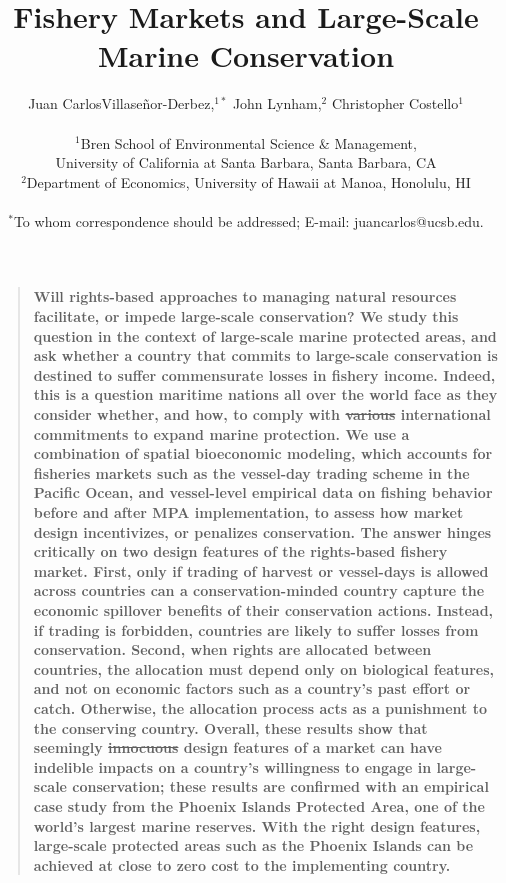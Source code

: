 \documentclass[12pt]{article}
\title{Fishery Markets and Large-Scale Marine Conservation}
\author{Juan CarlosVillase\~{n}or-Derbez,$^{1\ast}$ John Lynham,$^{2}$ Christopher Costello$^{1}$\\
\\
\normalsize{$^{1}$Bren School of Environmental Science \& Management,}\\
\normalsize{University of California at Santa Barbara, Santa Barbara, CA}\\
\normalsize{$^{2}$Department of Economics, University of Hawaii at Manoa, Honolulu, HI}\\
\\
\normalsize{$^\ast$To whom correspondence should be addressed; E-mail: juancarlos@ucsb.edu.}
}
\date{}
\newenvironment{sciabstract}{%
\begin{quote} \bf}
{\end{quote}}
\providecommand{\DIFaddtex}[1]{{\protect\color{blue}\uwave{#1}}} %
\providecommand{\DIFdeltex}[1]{{\protect\color{red}\sout{#1}}}                      %
\providecommand{\DIFaddbegin}{} %
\providecommand{\DIFaddend}{} %
\providecommand{\DIFdelbegin}{} %
\providecommand{\DIFdelend}{} %
\providecommand{\DIFadd}[1]{\texorpdfstring{\DIFaddtex{#1}}{#1}} %
\providecommand{\DIFdel}[1]{\texorpdfstring{\DIFdeltex{#1}}{}} %
\newcommand{\DIFscaledelfig}{0.5}
\newlength{\DIFdelgraphicswidth} %
\newlength{\DIFdelgraphicsheight} %
\newcommand{\DIFaddincludegraphics}[2][]{{\color{blue}\fbox{\DIFOincludegraphics[#1]{#2}}}} %
\newcommand{\DIFdelincludegraphics}[2][]{%
\sbox{\DIFdelgraphicsbox}{\DIFOincludegraphics[#1]{#2}}%
\settoboxwidth{\DIFdelgraphicswidth}{\DIFdelgraphicsbox} %
\settoboxtotalheight{\DIFdelgraphicsheight}{\DIFdelgraphicsbox} %
\scalebox{\DIFscaledelfig}{%
\parbox[b]{\DIFdelgraphicswidth}{\usebox{\DIFdelgraphicsbox}\\[-\baselineskip] \rule{\DIFdelgraphicswidth}{0em}}\llap{\resizebox{\DIFdelgraphicswidth}{\DIFdelgraphicsheight}{%
\setlength{\unitlength}{\DIFdelgraphicswidth}%
\begin{picture}(1,1)%
\thicklines\linethickness{2pt} %
{\color[rgb]{1,0,0}\put(0,0){\framebox(1,1){}}}%
{\color[rgb]{1,0,0}\put(0,0){\line( 1,1){1}}}%
{\color[rgb]{1,0,0}\put(0,1){\line(1,-1){1}}}%
\end{picture}%
}\hspace*{3pt}}} %
} %
\DeclareRobustCommand{\DIFaddbegin}{\DIFOaddbegin \let\includegraphics\DIFaddincludegraphics} %
\DeclareRobustCommand{\DIFaddend}{\DIFOaddend \let\includegraphics\DIFOincludegraphics} %
\DeclareRobustCommand{\DIFdelbegin}{\DIFOdelbegin \let\includegraphics\DIFdelincludegraphics} %
\DeclareRobustCommand{\DIFdelend}{\DIFOaddend \let\includegraphics\DIFOincludegraphics} %
\begin{document}

\baselineskip24pt


\maketitle



\begin{sciabstract}
Will rights-based approaches to managing natural resources facilitate, or impede large-scale conservation? We study this question in the context of large-scale marine protected areas, and ask whether a country that commits to large-scale conservation is destined to suffer commensurate losses in fishery income.  Indeed, this is a question maritime nations all over the world face as they consider whether, and how, to comply with \DIFdelbegin \DIFdel{various }\DIFdelend international commitments to expand marine protection. We use a combination of spatial bioeconomic modeling, which accounts for fisheries markets such as the vessel-day trading scheme in the Pacific Ocean, and vessel-level empirical data on fishing behavior before and after MPA implementation, to assess how market design incentivizes, or penalizes conservation. The answer hinges critically on two design features of the rights-based fishery market. First, only if trading of harvest or vessel-days is allowed across countries can a conservation-minded country capture the economic spillover benefits of their conservation actions.  Instead, if trading is forbidden, countries are likely to suffer losses from conservation. Second, when rights are allocated between countries, the allocation must depend only on biological features, and not on economic factors such as a country's past effort or catch. Otherwise, the allocation process acts as a punishment to the conserving country. Overall, these results show that seemingly \DIFdelbegin \DIFdel{innocuous }\DIFdelend \DIFaddbegin \DIFadd{benign }\DIFaddend design features of a market can have indelible impacts on a country's willingness to engage in large-scale conservation; these results are confirmed with an empirical case study from the Phoenix Islands Protected Area, one of the world's largest marine reserves. With the right design features, large-scale protected areas such as the Phoenix Islands can be achieved at close to zero cost to the implementing country.
\end{sciabstract}
\end{document}
